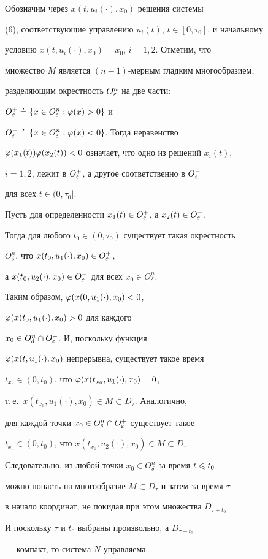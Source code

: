 \begin{pf}


Обозначим через $x(t,u_i(\cdot),x_0)$ решения системы


(6), соответствующие управлению $u_i(t)$, $t\in[0,\tau_0]$, и начальному


условию $x(t,u_i(\cdot),x_0)=x_0$, $i=1,2$. Отметим, что


множество $M$ является $(n-1)$-мерным гладким многообразием,


разделяющим окрестность $O^n_{\varepsilon}$ на две части:


$O_{\varepsilon}^{+}\doteq\{x\in O^n_{\varepsilon}:\varphi(x)>0\}$ и


$O_{\varepsilon}^{-}\doteq\{x\in O^n_{\varepsilon}:\varphi(x)<0\}$. Тогда неравенство


$\varphi(x_1(t))\varphi(x_2(t))<0$ означает, что одно из решений $x_i(t)$,


$i=1,2$, лежит в $O_{\varepsilon}^{+}$, а другое соответственно в $O_{\varepsilon}^{-}$


для всех $t\in(0,\tau_0]$.


Пусть для определенности $x_1(t)\in O_{\varepsilon}^{+}$, а $x_2(t)\in O_{\varepsilon}^{-}$.


Тогда для любого $t_0\in(0,\tau_0)$ существует такая окрестность


$O^n_{\delta}$, что $x(t_0,u_1(\cdot),x_0)\in O_{\varepsilon}^{+}$,


а $x(t_0,u_2(\cdot),x_0)\in O_{\varepsilon}^{-}$ для всех $x_0\in O^n_{\delta}$.


Таким образом, $\varphi(x(0,u_1(\cdot),x_0)<0$,


$\varphi(x(t_0,u_1(\cdot),x_0)>0$ для каждого


$x_0\in O^n_{\delta}\cap O^{-}_{\varepsilon}$. И, поскольку функция


$\varphi(x(t,u_1(\cdot),x_0)$ непрерывна, существует такое время


$t_{x_0}\in(0,t_0)$, что $\varphi(x(t_{x_0},u_1(\cdot),x_0)=0$,


т.\,е.~$x(t_{x_0},u_1(\cdot),x_0)\in M\subset D_{\tau}$. Аналогично,


для каждой точки $x_0\in O^n_{\delta}\cap O^{+}_{\varepsilon}$ существует такое


$t_{x_0}\in(0,t_0)$, что $x(t_{x_0},u_2(\cdot),x_0)\in M\subset D_{\tau}$.


Следовательно, из любой точки $x_0\in O^n_{\delta}$ за время $t\leqslant t_0$


можно попасть на многообразие $M\subset D_{\tau}$ и затем за время $\tau$


в начало координат, не покидая при этом множества $D_{\tau+t_0}$.


И поскольку $\tau$ и $t_0$ выбраны произвольно, а $D_{\tau+t_0}$


--- компакт, то система $N$-управляема.


\end{pf}





